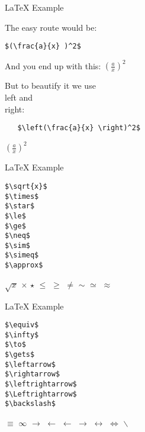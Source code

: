 \begin{frame}[t,fragile]{LaTeX Example}


The easy route would be:
\begin{lstlisting}
$(\frac{a}{x} )^2$
\end{lstlisting}

And you end up with this: $(\frac{a}{x} )^2$

But to beautify it we use \\left and \\right:

  \begin{lstlisting}
   $\left(\frac{a}{x} \right)^2$
  \end{lstlisting}
   $\left(\frac{a}{x} \right)^2$

\end{frame}

\begin{frame}[t,fragile]{LaTeX Example}


  \begin{lstlisting}
$\sqrt{x}$
$\times$
$\star$
$\le$
$\ge$
$\neq$
$\sim$
$\simeq$
$\approx$
  \end{lstlisting}

$\sqrt{x}$
$\times$
$\star$
$\le$
$\ge$
$\neq$
$\sim$
$\simeq$
$\approx$
\end{frame}

\begin{frame}[t,fragile]{LaTeX Example}
  \begin{lstlisting}
$\equiv$
$\infty$
$\to$
$\gets$
$\leftarrow$
$\rightarrow$
$\leftrightarrow$
$\Leftrightarrow$
$\backslash$
  \end{lstlisting}

$\equiv$
$\infty$
$\to$
$\gets$
$\leftarrow$
$\rightarrow$
$\leftrightarrow$
$\Leftrightarrow$
$\backslash$

\end{frame}

